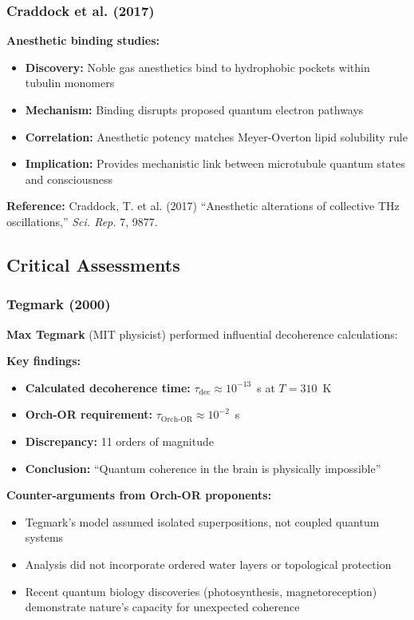 \subsubsection{Craddock et al. (2017)}

\textbf{Anesthetic binding studies:}
\begin{itemize}
\item \textbf{Discovery:} Noble gas anesthetics bind to hydrophobic pockets within tubulin monomers
\item \textbf{Mechanism:} Binding disrupts proposed quantum electron pathways
\item \textbf{Correlation:} Anesthetic potency matches Meyer-Overton lipid solubility rule
\item \textbf{Implication:} Provides mechanistic link between microtubule quantum states and consciousness
\end{itemize}

\textbf{Reference:} Craddock, T. et al. (2017) ``Anesthetic alterations of collective THz oscillations,'' \textit{Sci. Rep.} 7, 9877.

\subsection{Critical Assessments}

\subsubsection{Tegmark (2000)}

\textbf{Max Tegmark} (MIT physicist) performed influential decoherence calculations:

\textbf{Key findings:}
\begin{itemize}
\item \textbf{Calculated decoherence time:} $\tau_{\text{dec}} \approx 10^{-13}$~s at $T = 310$~K
\item \textbf{Orch-OR requirement:} $\tau_{\text{Orch-OR}} \approx 10^{-2}$~s
\item \textbf{Discrepancy:} 11 orders of magnitude
\item \textbf{Conclusion:} ``Quantum coherence in the brain is physically impossible''
\end{itemize}

\textbf{Counter-arguments from Orch-OR proponents:}
\begin{itemize}
\item Tegmark's model assumed isolated superpositions, not coupled quantum systems
\item Analysis did not incorporate ordered water layers or topological protection
\item Recent quantum biology discoveries (photosynthesis, magnetoreception) demonstrate nature's capacity for unexpected coherence
\end{itemize}

